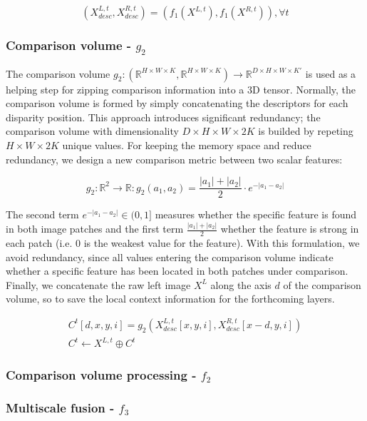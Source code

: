 \documentclass[10pt]{article}
\begin{document}
$$ (X^{L,t}_{desc}, X^{R,t}_{desc}) = (f_1(X^{L,t}), f_1(X^{R, t})), \forall t$$

\subsubsection{Comparison volume - $g_2$}

The comparison volume $g_2: (\mathbb{R}^{H \times W \times K}, \mathbb{R}^{H \times W \times K}) \rightarrow \mathbb{R}^{D \times H \times W \times K'}$ is used as a helping step for zipping comparison information into a 3D tensor. Normally, the comparison volume is formed by simply concatenating the descriptors for each disparity position. This approach introduces significant redundancy; the comparison volume with dimensionality $D \times H \times W \times 2K$ is builded by repeting  $H \times W \times 2K$ unique values. For keeping the memory space and reduce redundancy, we design a new comparison metric between two scalar features:

$$ g_2: \mathbb{R}^2 \rightarrow \mathbb{R}: g_2(a_1, a_2) = \frac{|a_1| + |a_2|}{2} \cdot e^{-|a_1 - a_2|} $$

The second term $e^{-|a_1 - a_2|} \in (0,1]$ measures whether the specific feature is found in both image patches and the first term $\frac{|a_1| + |a_2|}{2}$ whether the feature is strong in each patch (i.e. $0$ is the weakest value for the feature). With this formulation, we avoid redundancy, since all values entering the comparison volume indicate whether a specific feature has been located in both patches under comparison.
Finally, we concatenate the raw left image $X^L$ along the axis $d$ of the comparison volume, so to save the local context information for the forthcoming layers.

\begin{equation}
\begin{gathered} \label{eq:comparison_volume}
    C^t[d, x, y, i] = g_2( X^{L, t}_{desc}[x,y,i], X^{R, t}_{desc}[x-d,y, i]) \\
    C^t \leftarrow X^{L, t} \oplus C^t
\end{gathered}
\end{equation}

\subsubsection{Comparison volume processing - $f_2$}


\subsubsection{Multiscale fusion - $f_3$}
\end{document}
